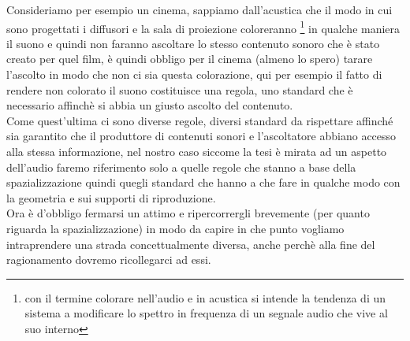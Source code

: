 \documentclass[12pt,a4paper]{report}
\begin{document}
Consideriamo per esempio un cinema, sappiamo dall'acustica che il modo in cui sono progettati i diffusori e la sala di proiezione coloreranno \footnote{con il termine colorare nell'audio e in acustica si intende la tendenza di un sistema a modificare lo spettro in frequenza di un segnale audio che vive al suo interno} in qualche maniera il suono e quindi non faranno ascoltare lo stesso contenuto sonoro che è stato creato per quel film, è quindi obbligo per il cinema (almeno lo spero) tarare l'ascolto in modo che non ci sia questa colorazione, qui per esempio il fatto   di rendere non colorato il suono costituisce una regola, uno standard che è necessario affinchè si abbia un giusto ascolto del contenuto.\\

Come quest'ultima ci sono diverse regole, diversi standard da rispettare affinché sia garantito che il produttore di contenuti sonori e l'ascoltatore abbiano accesso alla stessa informazione, nel nostro caso siccome la tesi è mirata ad un aspetto dell'audio faremo riferimento solo a quelle regole che stanno a base della spazializzazione quindi quegli standard che hanno a che fare in qualche modo con la geometria e sui supporti di riproduzione.\\

Ora è d'obbligo fermarsi un attimo e ripercorrergli brevemente (per quanto riguarda la spazializzazione) in modo da capire in che punto vogliamo intraprendere una strada concettualmente diversa, anche perchè alla fine del ragionamento dovremo ricollegarci ad essi.



\end{document}
